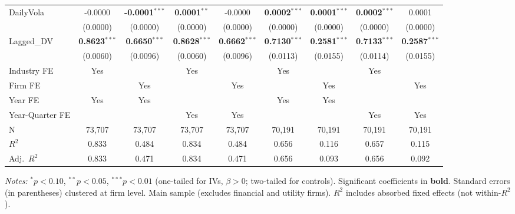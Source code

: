 \documentclass[11pt,a4paper]{article}
\begin{document}
\begin{table}[htbp]
\begin{tabular}{lcccccccc}
DailyVola & -0.0000 & \textbf{-0.0001}$^{***}$ & \textbf{0.0001}$^{**}$ & -0.0000 & \textbf{0.0002}$^{***}$ & \textbf{0.0001}$^{***}$ & \textbf{0.0002}$^{***}$ & 0.0001 \\
 & (0.0000) & (0.0000) & (0.0000) & (0.0000) & (0.0000) & (0.0000) & (0.0000) & (0.0000) \\
Lagged\_DV & \textbf{0.8623}$^{***}$ & \textbf{0.6650}$^{***}$ & \textbf{0.8628}$^{***}$ & \textbf{0.6662}$^{***}$ & \textbf{0.7130}$^{***}$ & \textbf{0.2581}$^{***}$ & \textbf{0.7133}$^{***}$ & \textbf{0.2587}$^{***}$ \\
 & (0.0060) & (0.0096) & (0.0060) & (0.0096) & (0.0113) & (0.0155) & (0.0114) & (0.0155) \\
\midrule
Industry FE & Yes &  & Yes &  & Yes &  & Yes &  \\
Firm FE &  & Yes &  & Yes &  & Yes &  & Yes \\
Year FE & Yes & Yes &  &  & Yes & Yes &  &  \\
Year-Quarter FE &  &  & Yes & Yes &  &  & Yes & Yes \\
\midrule
N & 73,707 & 73,707 & 73,707 & 73,707 & 70,191 & 70,191 & 70,191 & 70,191 \\
$R^2$ & 0.833 & 0.484 & 0.834 & 0.484 & 0.656 & 0.116 & 0.657 & 0.115 \\
Adj.~$R^2$ & 0.833 & 0.471 & 0.834 & 0.471 & 0.656 & 0.093 & 0.656 & 0.092 \\
\bottomrule
\end{tabular}
\begin{minipage}{\linewidth}
\vspace{2pt}\scriptsize
\textit{Notes:} $^{*}p<0.10$, $^{**}p<0.05$, $^{***}p<0.01$ (one-tailed for IVs, $\beta > 0$; two-tailed for controls).
 Significant coefficients in \textbf{bold}.
 Standard errors (in parentheses) clustered at firm level.
 Main sample (excludes financial and utility firms).
 $R^2$ includes absorbed fixed effects (not within-$R^2$).
\end{minipage}
\end{table}
\clearpage
\end{document}
